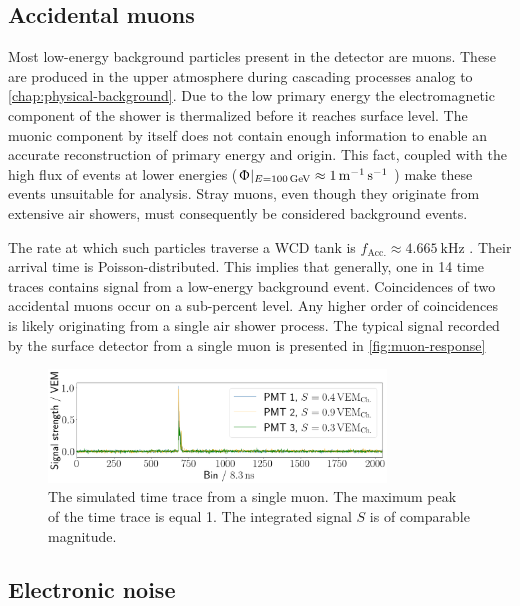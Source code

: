 \subsection{Accidental muons}
\label{ssec:accidental-muons}

Most low-energy background particles present in the detector are muons. These are produced in the upper atmosphere during cascading processes analog to 
\autoref{chap:physical-background}. Due to the low primary energy the electromagnetic component of the shower is thermalized before it reaches surface level. The 
muonic component by itself does not contain enough information to enable an accurate reconstruction of primary energy and origin. This fact, coupled with the high
flux of events at lower energies ($\Upphi|_{E=\SI{100}{\giga\electronvolt}} \approx \SI[per-mode=power]{1}{\per\meter\per\second}$ \cite{boezio2000measurement}) 
make these events unsuitable for analysis. Stray muons, even though they originate from extensive air showers, must consequently be considered background events.

The rate at which such particles traverse a WCD tank is $f_\text{Acc.}\approx\SI{4.665}{\kilo\hertz}$ \cite{DavidInjectionFrequency}. Their arrival time is 
Poisson-distributed. This implies that generally, one in 14 time traces contains signal from a low-energy background event. Coincidences of two accidental 
muons occur on a sub-percent level. Any higher order of coincidences is likely originating from a single air shower process. The typical signal recorded by the 
surface detector from a single muon is presented in \autoref{fig:muon-response}

\begin{figure}
	\centering
	\includegraphics[width=0.8\textwidth]{./plots/muon_response.png}
	\caption{The simulated time trace from a single muon. The maximum peak of the time trace is equal \SI{1}{\Peak}. The integrated signal $S$ is of comparable
	magnitude.}
	\label{fig:muon-response}
\end{figure}

\subsection{Electronic noise}
\label{ssec:electronic-noise}

